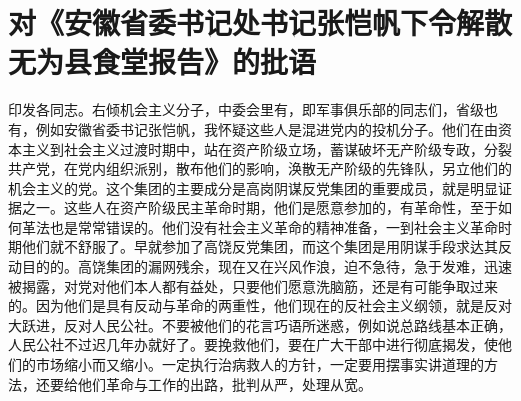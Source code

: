 \section[对《安徽省委书记处书记张恺帆下令解散无为县食堂报告》的批语（一九五九年八月十日）]{对《安徽省委书记处书记张恺帆下令解散无为县食堂报告》的批语}


印发各同志。右倾机会主义分子，中委会里有，即军事俱乐部的同志们，省级也有，例如安徽省委书记张恺帆，我怀疑这些人是混进党内的投机分子。他们在由资本主义到社会主义过渡时期中，站在资产阶级立场，蓄谋破坏无产阶级专政，分裂共产党，在党内组织派别，散布他们的影响，涣散无产阶级的先锋队，另立他们的机会主义的党。这个集团的主要成分是高岗阴谋反党集团的重要成员，就是明显证据之一。这些人在资产阶级民主革命时期，他们是愿意参加的，有革命性，至于如何革法也是常常错误的。他们没有社会主义革命的精神准备，一到社会主义革命时期他们就不舒服了。早就参加了高饶反党集团，而这个集团是用阴谋手段求达其反动目的的。高饶集团的漏网残余，现在又在兴风作浪，迫不急待，急于发难，迅速被揭露，对党对他们本人都有益处，只要他们愿意洗脑筋，还是有可能争取过来的。因为他们是具有反动与革命的两重性，他们现在的反社会主义纲领，就是反对大跃进，反对人民公社。不要被他们的花言巧语所迷惑，例如说总路线基本正确，人民公社不过迟几年办就好了。要挽救他们，要在广大干部中进行彻底揭发，使他们的市场缩小而又缩小。一定执行治病救人的方针，一定要用摆事实讲道理的方法，还要给他们革命与工作的出路，批判从严，处理从宽。


